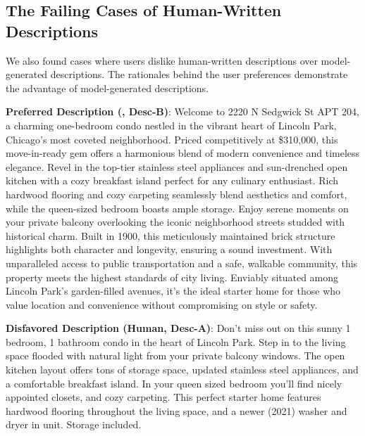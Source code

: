 \subsection{The Failing Cases of Human-Written Descriptions}
We also found cases where users dislike human-written descriptions over model-generated descriptions. The rationales behind the user preferences demonstrate the advantage of model-generated descriptions.

\begin{center}\begin{tcolorbox}[colback=white,colframe=gray!20,width=0.95\textwidth]
   {\footnotesize \textbf{Preferred Description (\agentname, Desc-B)}:  Welcome to 2220 N Sedgwick St APT 204, a charming one-bedroom condo nestled in the vibrant heart of Lincoln Park, Chicago's most coveted neighborhood. Priced competitively at \$310,000, this move-in-ready gem offers a harmonious blend of modern convenience and timeless elegance. Revel in the top-tier stainless steel appliances and sun-drenched open kitchen with a cozy breakfast island perfect for any culinary enthusiast. Rich hardwood flooring and cozy carpeting seamlessly blend aesthetics and comfort, while the queen-sized bedroom boasts ample storage. Enjoy serene moments on your private balcony overlooking the iconic neighborhood streets studded with historical charm. Built in 1900, this meticulously maintained brick structure highlights both character and longevity, ensuring a sound investment. With unparalleled access to public transportation and a safe, walkable community, this property meets the highest standards of city living. Enviably situated among Lincoln Park's garden-filled avenues, it’s the ideal starter home for those who value location and convenience without compromising on style or safety. }
    \vspace{0.2em}

    {\footnotesize \textbf{Disfavored Description (Human, Desc-A)}:  Don't miss out on this sunny 1 bedroom, 1 bathroom condo in the heart of Lincoln Park. Step in to the living space flooded with natural light from your private balcony windows. The open kitchen layout offers tons of storage space, updated stainless steel appliances, and a comfortable breakfast island. In your queen sized bedroom you'll find nicely appointed closets, and cozy carpeting. This perfect starter home features hardwood flooring throughout the living space, and a newer (2021) washer and dryer in unit. Storage included. }
    \vspace{0.2em}


\end{tcolorbox}
\end{center}
